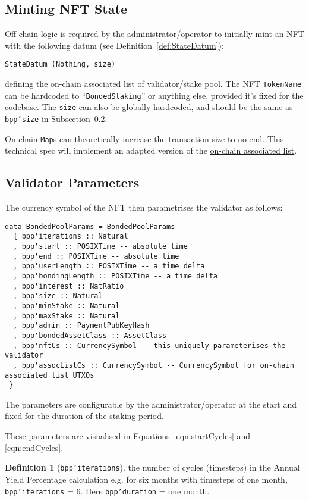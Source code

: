 \documentclass[10pt, a4paper]{article}
\theoremstyle{definition}
\newtheorem{definition}{Definition}[section]
\begin{document}
\subsection{Minting NFT State}\label{subsection:mintNft}
Off-chain logic is required by the administrator/operator to initially mint an NFT with the following datum (see Definition~\ref{def:StateDatum}):
\begin{verbatim}
StateDatum (Nothing, size)
\end{verbatim}
defining the on-chain associated list of validator/stake pool. The NFT \texttt{TokenName} can be hardcoded to ``\texttt{BondedStaking}'' or anything else, provided it's fixed for the codebase. The \texttt{size} can also be globally hardcoded, and should be the same as \texttt{bpp'size} in Subsection~\ref{subsection:validatorParams}.

On-chain \texttt{Map}s can theoretically increase the transaction size to no end.  This technical spec will implement an adapted version of the  \href{https://github.com/Plutonomicon/plutonomicon/blob/main/assoc.md}{on-chain associated list}.


\subsection{Validator Parameters}\label{subsection:validatorParams}
The currency symbol of the NFT then parametrises the validator as follows:
\begin{verbatim}
data BondedPoolParams = BondedPoolParams
  { bpp'iterations :: Natural
  , bpp'start :: POSIXTime -- absolute time
  , bpp'end :: POSIXTime -- absolute time
  , bpp'userLength :: POSIXTime -- a time delta
  , bpp'bondingLength :: POSIXTime -- a time delta
  , bpp'interest :: NatRatio
  , bpp'size :: Natural
  , bpp'minStake :: Natural
  , bpp'maxStake :: Natural
  , bpp'admin :: PaymentPubKeyHash
  , bpp'bondedAssetClass :: AssetClass
  , bpp'nftCs :: CurrencySymbol -- this uniquely parameterises the validator
  , bpp'assocListCs :: CurrencySymbol -- CurrencySymbol for on-chain associated list UTXOs
 }
\end{verbatim}
The parameters are configurable by the administrator/operator at the start and fixed for the duration of the staking period.

These parameters are visualised in Equations~\ref{eqn:startCycles} and \ref{eqn:endCycles}.

\begin{definition}[\texttt{bpp'iterations}]\label{def:bpp'iterations}
the number of cycles (timesteps) in the Annual Yield Percentage calculation e.g. for six months with timesteps of one month, \texttt{bpp'iterations} = 6. Here \texttt{bpp'duration} = one month.
\end{definition}
\end{document}
